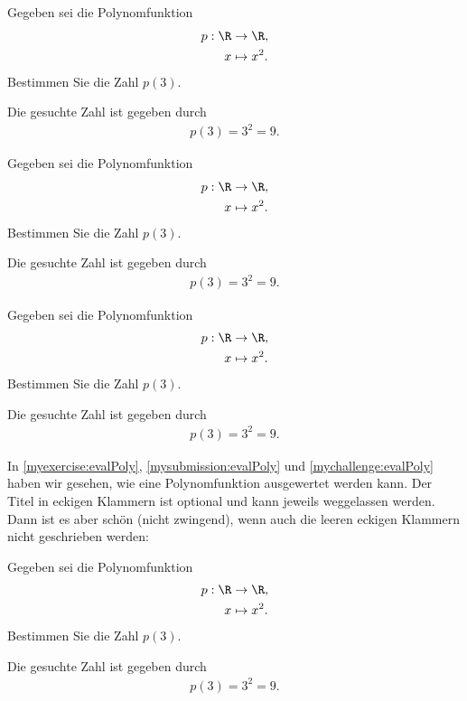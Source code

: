 \begin{myexercise}[Polynomfunktion]
\label{myexercise:evalPoly}
  Gegeben sei die Polynomfunktion
  \begin{align*}
    p:  \R &\to \R, \\
        x  &\mapsto x^2.
    \end{align*}
  Bestimmen Sie die Zahl $p(3)$.
    \begin{myanswer}
      Die gesuchte Zahl ist gegeben durch
      \begin{align*}
        p(3) = 3^2 = 9.    
      \end{align*}
    \end{myanswer}
\end{myexercise}

\begin{mysubmission}[Polynomfunktion]
\label{mysubmission:evalPoly}
  Gegeben sei die Polynomfunktion
  \begin{align*}
    p:  \R &\to \R, \\
        x  &\mapsto x^2.
    \end{align*}
  Bestimmen Sie die Zahl $p(3)$.
    \begin{myanswer}
      Die gesuchte Zahl ist gegeben durch
      \begin{align*}
        p(3) = 3^2 = 9.    
      \end{align*}
    \end{myanswer}
\end{mysubmission}

\begin{mychallenge}[Polynomfunktion]
\label{mychallenge:evalPoly}
  Gegeben sei die Polynomfunktion
  \begin{align*}
    p:  \R &\to \R, \\
        x  &\mapsto x^2.
    \end{align*}
  Bestimmen Sie die Zahl $p(3)$.
    \begin{myanswer}
      Die gesuchte Zahl ist gegeben durch
      \begin{align*}
        p(3) = 3^2 = 9.    
      \end{align*}
    \end{myanswer}
\end{mychallenge}
In \cref{myexercise:evalPoly}, \cref{mysubmission:evalPoly} und \cref{mychallenge:evalPoly} haben wir gesehen, wie eine
Polynomfunktion ausgewertet werden kann. Der Titel in eckigen Klammern ist optional und kann jeweils weggelassen werden. Dann
ist es aber schön (nicht zwingend), wenn auch die leeren eckigen Klammern nicht geschrieben werden:
\begin{mysubmission}
  Gegeben sei die Polynomfunktion
  \begin{align*}
    p:  \R &\to \R, \\
        x  &\mapsto x^2.
    \end{align*}
  Bestimmen Sie die Zahl $p(3)$.
    \begin{myanswer}
      Die gesuchte Zahl ist gegeben durch
      \begin{align*}
        p(3) = 3^2 = 9.    
      \end{align*}
    \end{myanswer}
\end{mysubmission}

